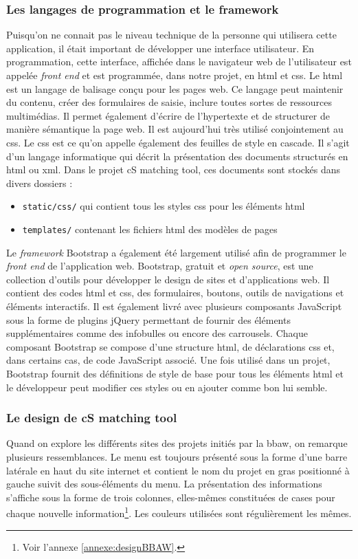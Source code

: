 \documentclass[a4paper, 12pt, twoside]{book}
\begin{document}
\subsubsection{Les langages de programmation et le framework}
Puisqu'on ne connait pas le niveau technique de la personne qui utilisera cette application, il était important de développer une interface utilisateur. En programmation, cette interface, affichée dans le navigateur web de l'utilisateur est appelée \textit{front end} et est programmée, dans notre projet, en \gls{html} et \gls{css}. Le \gls{html} est un langage de balisage conçu pour les pages web. Ce langage peut maintenir du contenu, créer des formulaires de saisie, inclure toutes sortes de ressources multimédias. Il permet également d'écrire de l'hypertexte et de structurer de manière sémantique la page web. Il est aujourd'hui très utilisé conjointement au \gls{css}. Le \gls{css} est ce qu'on appelle également des feuilles de style en cascade. Il s'agit d'un langage informatique qui décrit la présentation des documents structurés en \gls{html} ou \gls{xml}. 
Dans le projet cS matching tool, ces documents sont stockés dans divers dossiers :
\begin{itemize}
    \item \texttt{static/css/} qui contient tous les styles \gls{css} pour les éléments \gls{html}
    \item \texttt{templates/} contenant les fichiers \gls{html} des modèles de pages
\end{itemize}

Le \textit{framework} Bootstrap a également été largement utilisé afin de programmer le \textit{front end} de l'application web. Bootstrap, gratuit et \textit{open source}, est une collection d'outils pour développer le design de sites et d'applications web. Il contient des codes \gls{html} et \gls{css}, des formulaires, boutons, outils de navigations et éléments interactifs. Il est également livré avec plusieurs composants JavaScript sous la forme de plugins jQuery permettant de fournir des éléments supplémentaires comme des infobulles ou encore des carrousels. Chaque composant Bootstrap se compose d'une structure \gls{html}, de déclarations \gls{css} et, dans certains cas, de code JavaScript associé. Une fois utilisé dans un projet, Bootstrap fournit des définitions de style de base pour tous les éléments \gls{html} et le développeur peut modifier ces styles ou en ajouter comme bon lui semble.  

\subsubsection{Le design de cS matching tool}
Quand on explore les différents sites des projets initiés par la \gls{bbaw}, on remarque plusieurs ressemblances. Le menu est toujours présenté sous la forme d'une barre latérale en haut du site internet et contient le nom du projet en gras positionné à gauche suivit des sous-éléments du menu. La présentation des informations s'affiche sous la forme de trois colonnes, elles-mêmes constituées de cases pour chaque nouvelle information\footnote{Voir l'annexe \ref{annexe:designBBAW}.}. Les couleurs utilisées sont régulièrement les mêmes.
\end{document}
